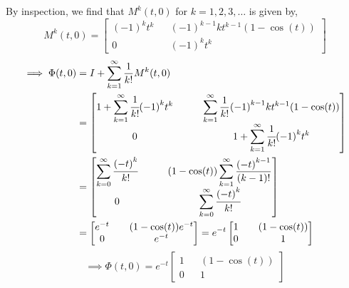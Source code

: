 By inspection, we find that \( M^{k} (t, 0) \) for \( k = 1, 2, 3, \ldots \) is given by,
\begin{equation*}
    M^{k} (t, 0)
    =
    \begin{bmatrix}
        {(-1)}^{k} t^{k}
         &  &
        {(-1)}^{k-1} k t^{k-1} (1 - \cos(t))
        \\
        0
         &  &
        {(-1)}^{k} t^{k}
    \end{bmatrix}
\end{equation*}
\begin{align*}
    \implies
    \Phi(t, 0)
     & =
    I + \sum_{k=1}^{\infty} \frac{1}{k!} M^{k} (t, 0)
    \\ & =
    \begin{bmatrix}
        \displaystyle
        1 + \sum_{k=1}^{\infty} \cfrac{1}{k!} {(-1)}^{k} t^{k}
         &  &  &
        \displaystyle
        \sum_{k=1}^{\infty} \frac{1}{k!} {(-1)}^{k-1} k t^{k-1} (1 - \cos(t))
        \\
        0
         &  &  &
        \displaystyle
        1 + \sum_{k=1}^{\infty} \cfrac{1}{k!} {(-1)}^{k} t^{k}
    \end{bmatrix}
    \\ & =
    \begin{bmatrix}
        \displaystyle
        \sum_{k=0}^{\infty} \cfrac{{(-t)}^{k}}{k!}
         &  &  &
        \displaystyle
        (1 - \cos(t)) \sum_{k=1}^{\infty} \frac{{(-t)}^{k-1}}{(k-1)!}
        \\
        0
         &  &  &
        \displaystyle
        \sum_{k=0}^{\infty} \cfrac{{(-t)}^{k}}{k!}
    \end{bmatrix}
    \\ & =
    \begin{bmatrix}
        e^{-t}
         &  &
        (1 - \cos(t)) e^{-t}
        \\
        0
         &  &
        e^{-t}
    \end{bmatrix}
    =
    e^{-t}
    \begin{bmatrix}
        1
         &  &
        (1 - \cos(t))
        \\
        0
         &  &
        1
    \end{bmatrix}
\end{align*}
\begin{equation*}
    \implies
    \boxed{
        \Phi(t, 0)
        =
        e^{-t}
        \begin{bmatrix}
            1
             &  &
            (1 - \cos(t))
            \\
            0
             &  &
            1
        \end{bmatrix}
    }
\end{equation*}

